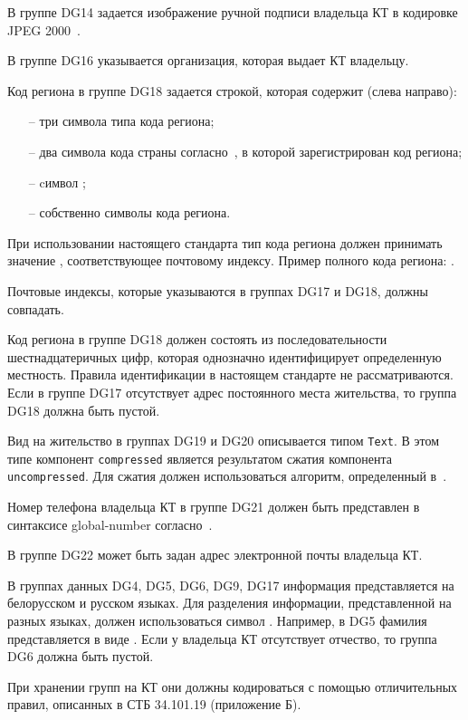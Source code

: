 В группе DG14 задается изображение ручной подписи
владельца КТ в кодировке JPEG 2000~\cite{JPEG2000}.

В группе DG16 указывается организация, которая выдает КТ владельцу. 

Код региона в группе DG18 задается строкой, которая содержит (слева направо):
\begin{itemize}
\item[--]
три символа типа кода региона;
\item[--]
два символа кода страны согласно~\cite{CountryCodes}, в которой зарегистрирован 
код региона;
\item[--]
cимвол \str{-}; 
\item[--]
собственно символы кода региона.
\end{itemize}

При использовании настоящего стандарта тип кода региона
должен принимать значение , соответствующее
почтовому индексу. Пример полного кода региона: .

Почтовые индексы, которые указываются в группах DG17 и DG18,
должны совпадать.

Код региона в группе DG18 должен состоять из последовательности 
шестнадцатеричных цифр, которая однозначно идентифицирует определенную 
местность. Правила идентификации в настоящем стандарте не рассматриваются. 
Если в группе DG17 отсутствует адрес постоянного места жительства, то 
группа DG18 должна быть пустой. 
\fi


Вид на жительство в группах DG19 и DG20 описывается типом \verb|Text|. 
В этом типе компонент \verb|compressed| является результатом сжатия компонента 
\verb|uncompressed|. Для сжатия должен использоваться алгоритм, 
определенный в~\cite{DEFLATE}. 
\fi

Номер телефона владельца КТ в группе DG21 должен быть
представлен в синтаксисе global-number согласно~\cite{RFC3966}. 

В группе DG22 может быть задан адрес электронной почты владельца КТ. 

В группах данных DG4, DG5, DG6, DG9, DG17 информация
представляется на белорусском и русском языках.
Для разделения информации, представленной на разных языках,
должен использоваться символ \str{/}. Например, в DG5 фамилия 
представляется в виде .
Если у владельца КТ отсутствует отчество, то группа DG6 должна быть пустой. 

При хранении групп на КТ они должны кодироваться с помощью отличительных 
правил, описанных в СТБ 34.101.19 (приложение Б). 

